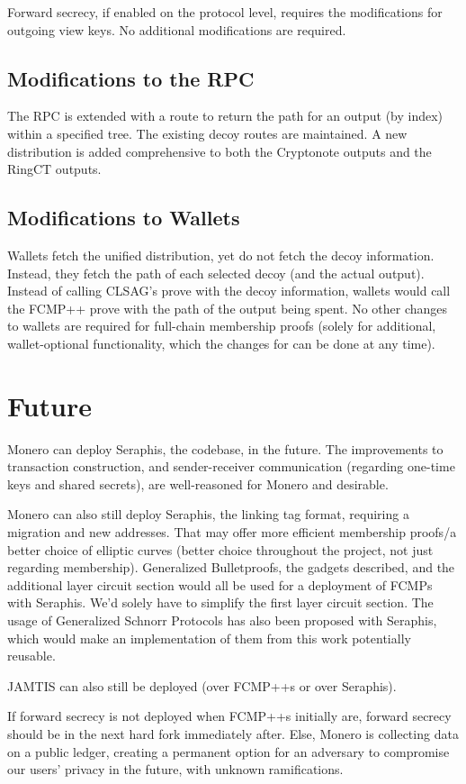 \documentclass[]{article}
\begin{document}
Forward secrecy, if enabled on the protocol level, requires the modifications for outgoing view keys. No additional modifications are required.

\subsection{Modifications to the RPC}

The RPC is extended with a route to return the path for an output (by index) within a specified tree. The existing decoy routes are maintained. A new distribution is added comprehensive to both the Cryptonote outputs and the RingCT outputs.

\subsection{Modifications to Wallets}

Wallets fetch the unified distribution, yet do not fetch the decoy information. Instead, they fetch the path of each selected decoy (and the actual output). Instead of calling CLSAG's prove with the decoy information, wallets would call the FCMP++ prove with the path of the output being spent. No other changes to wallets are required for full-chain membership proofs (solely for additional, wallet-optional functionality, which the changes for can be done at any time).

\newpage

\section{Future}

Monero can deploy Seraphis, the codebase, in the future. The improvements to transaction construction, and sender-receiver communication (regarding one-time keys and shared secrets), are well-reasoned for Monero and desirable.

Monero can also still deploy Seraphis, the linking tag format, requiring a migration and new addresses. That may offer more efficient membership proofs/a better choice of elliptic curves (better choice throughout the project, not just regarding membership). Generalized Bulletproofs, the gadgets described, and the additional layer circuit section would all be used for a deployment of FCMPs with Seraphis. We'd solely have to simplify the first layer circuit section. The usage of Generalized Schnorr Protocols has also been proposed with Seraphis, which would make an implementation of them from this work potentially reusable.

JAMTIS can also still be deployed (over FCMP++s or over Seraphis).

If forward secrecy is not deployed when FCMP++s initially are, forward secrecy should be in the next hard fork immediately after. Else, Monero is collecting data on a public ledger, creating a permanent option for an adversary to compromise our users' privacy in the future, with unknown ramifications.
\end{document}
